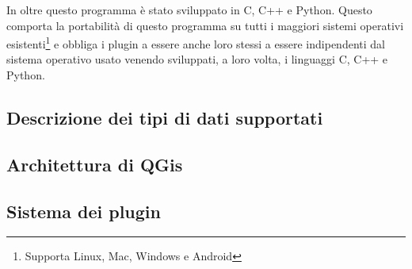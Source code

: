 In oltre questo programma è stato sviluppato in C, C++ e Python. Questo comporta la portabilità di questo programma su tutti i maggiori sistemi operativi esistenti\footnote{Supporta Linux, Mac, Windows e Android} e obbliga i plugin a essere anche loro stessi a essere indipendenti dal sistema operativo usato venendo sviluppati, a loro volta, i linguaggi C, C++ e Python.

\subsection{Descrizione dei tipi di dati supportati}

\subsection{Architettura di QGis}

\subsection{Sistema dei plugin}
